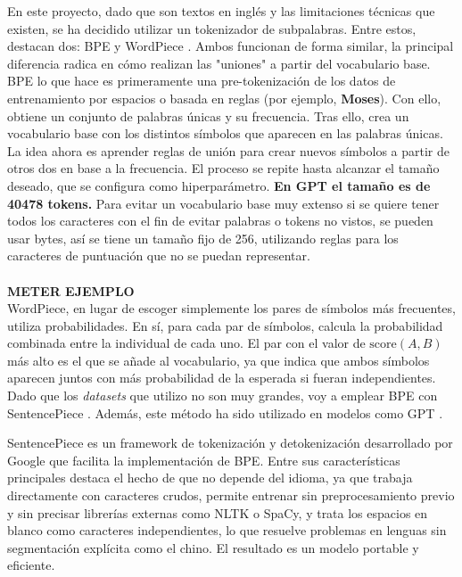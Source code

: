 \documentclass[11pt]{book}
\begin{document}
En este proyecto, dado que son textos en inglés y las limitaciones técnicas que existen, se ha decidido utilizar un tokenizador de subpalabras. Entre estos, destacan dos: BPE y WordPiece \parencite{huggingface_tokenizer_summary}. Ambos funcionan de forma similar, la principal diferencia radica en cómo realizan las "uniones" a partir del vocabulario base. BPE lo que hace es primeramente una pre-tokenización de los datos de entrenamiento por espacios o basada en reglas (por ejemplo, \textbf{Moses}). Con ello, obtiene un conjunto de palabras únicas y su frecuencia. Tras ello, crea un vocabulario base con los distintos símbolos que aparecen en las palabras únicas. La idea ahora es aprender reglas de unión para crear nuevos símbolos a partir de otros dos en base a la frecuencia. El proceso se repite hasta alcanzar el tamaño deseado, que se configura como hiperparámetro. \textbf{En GPT el tamaño es de 40478 tokens.} Para evitar un vocabulario base muy extenso si se quiere tener todos los caracteres con el fin de evitar palabras o tokens no vistos, se pueden usar bytes, así se tiene un tamaño fijo de 256, utilizando reglas para los caracteres de puntuación que no se puedan representar. \\
\\
\textbf{METER EJEMPLO}\\

WordPiece, en lugar de escoger simplemente los pares de símbolos más frecuentes, utiliza probabilidades. En sí, para cada par de símbolos, calcula la probabilidad combinada entre la individual de cada uno. El par con el valor de $\text{score}(A,B)$ más alto es el que se añade al vocabulario, ya que indica que ambos símbolos aparecen juntos con más probabilidad de la esperada si fueran independientes.\\

Dado que los \textit{datasets} que utilizo no son muy grandes, voy a emplear BPE con SentencePiece \parencite{google_sentencepiece}. Además, este método ha sido utilizado en modelos como GPT \parencite{reddit2021tokenizers}. 

SentencePiece es un framework de tokenización y detokenización desarrollado por Google que facilita la implementación de BPE. Entre sus características principales destaca el hecho de que no depende del idioma, ya que trabaja directamente con caracteres crudos, permite entrenar sin preprocesamiento previo y sin precisar librerías externas como NLTK o SpaCy, y trata los espacios en blanco como caracteres independientes, lo que resuelve problemas en lenguas sin segmentación explícita como el chino. El resultado es un modelo portable y eficiente. 
\end{document}
